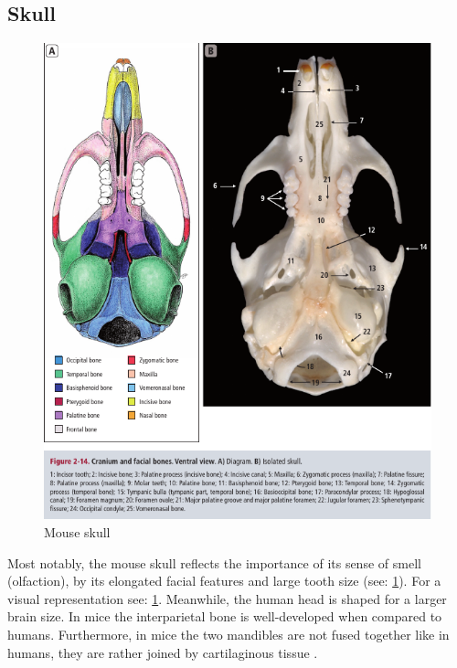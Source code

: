 \subsection{Skull}\label{s:b-mouse-skull}
\begin{figure}[h]
	\centerline{
		\includegraphics[scale=0.7]{images/mouseSkull.png}}
	\caption{Mouse skull \cite{ruberteBridgingMouseHuman2023}}\label{fig:mouseSkull}
\end{figure}

\noindent
Most notably, the mouse skull reflects the importance of its sense of smell (olfaction),
by its elongated facial features and large tooth size (see: \cref{fig:mouseSkull}).
For a visual representation see: \cref{fig:mouseSkull}.
Meanwhile, the human head is shaped for a larger brain size.
In mice the interparietal bone is well-developed when compared to humans.
Furthermore, in mice the two mandibles are not fused together like in humans,
they are rather joined by cartilaginous tissue \cite{jeromeSkeletalSystem2018,halleOpenAnatomyBrowser2017,platzerTaschenatlasAnatomieBd2013}.

